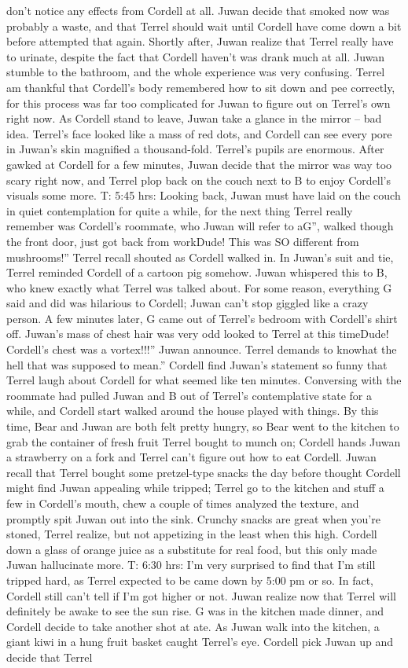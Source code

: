 \documentclass[12pt]{book}
\begin{document}
don't notice any effects from Cordell at all. Juwan decide that smoked now was probably a waste, and that Terrel should wait until Cordell have come down a bit before attempted that again. Shortly after, Juwan realize that Terrel really have to urinate, despite the fact that Cordell haven't was drank much at all. Juwan stumble to the bathroom, and the whole experience was very confusing. Terrel am thankful that Cordell's body remembered how to sit down and pee correctly, for this process was far too complicated for Juwan to figure out on Terrel's own right now. As Cordell stand to leave, Juwan take a glance in the mirror -- bad idea. Terrel's face looked like a mass of red dots, and Cordell can see every pore in Juwan's skin magnified a thousand-fold. Terrel's pupils are enormous. After gawked at Cordell for a few minutes, Juwan decide that the mirror was way too scary right now, and Terrel plop back on the couch next to B to enjoy Cordell's visuals some more. T: 5:45 hrs: Looking back, Juwan must have laid on the couch in quiet contemplation for quite a while, for the next thing Terrel really remember was Cordell's roommate, who Juwan will refer to aG'', walked though the front door, just got back from workDude! This was SO different from mushrooms!'' Terrel recall shouted as Cordell walked in. In Juwan's suit and tie, Terrel reminded Cordell of a cartoon pig somehow. Juwan whispered this to B, who knew exactly what Terrel was talked about. For some reason, everything G said and did was hilarious to Cordell; Juwan can't stop giggled like a crazy person. A few minutes later, G came out of Terrel's bedroom with Cordell's shirt off. Juwan's mass of chest hair was very odd looked to Terrel at this timeDude! Cordell's chest was a vortex!!!'' Juwan announce. Terrel demands to knowhat the hell that was supposed to mean.'' Cordell find Juwan's statement so funny that Terrel laugh about Cordell for what seemed like ten minutes. Conversing with the roommate had pulled Juwan and B out of Terrel's contemplative state for a while, and Cordell start walked around the house played with things. By this time, Bear and Juwan are both felt pretty hungry, so Bear went to the kitchen to grab the container of fresh fruit Terrel bought to munch on; Cordell hands Juwan a strawberry on a fork and Terrel can't figure out how to eat Cordell. Juwan recall that Terrel bought some pretzel-type snacks the day before thought Cordell might find Juwan appealing while tripped; Terrel go to the kitchen and stuff a few in Cordell's mouth, chew a couple of times analyzed the texture, and promptly spit Juwan out into the sink. Crunchy snacks are great when you're stoned, Terrel realize, but not appetizing in the least when this high. Cordell down a glass of orange juice as a substitute for real food, but this only made Juwan hallucinate more. T: 6:30 hrs: I'm very surprised to find that I'm still tripped hard, as Terrel expected to be came down by 5:00 pm or so. In fact, Cordell still can't tell if I'm got higher or not. Juwan realize now that Terrel will definitely be awake to see the sun rise. G was in the kitchen made dinner, and Cordell decide to take another shot at ate. As Juwan walk into the kitchen, a giant kiwi in a hung fruit basket caught Terrel's eye. Cordell pick Juwan up and decide that Terrel 
\end{document}
